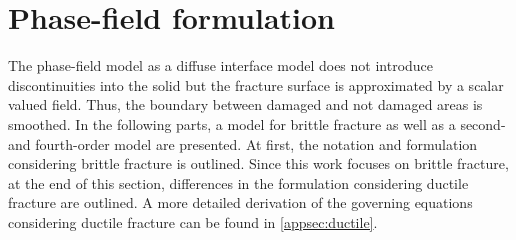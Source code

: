 \section{Phase-field formulation} \label{sec:formul}
The phase-field model as a diffuse interface model does not introduce discontinuities into the solid but the fracture surface is approximated by a scalar valued field. Thus, the boundary between damaged and not damaged areas is smoothed. In the following parts, a model for brittle fracture as well as a second- and fourth-order model are presented. At first, the notation and formulation considering brittle fracture is outlined. Since this work focuses on brittle fracture, at the end of this section, differences in the formulation considering ductile fracture are outlined. A more detailed derivation of the governing equations considering ductile fracture can be found in \ref{appsec:ductile}. 

